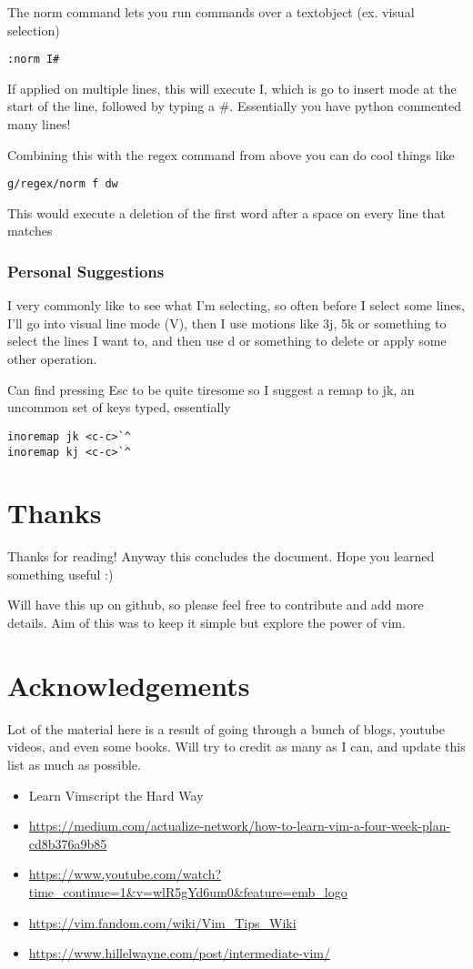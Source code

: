 \documentclass[12pt, letterpaper]{article}
\begin{document}
The norm command lets you run commands over a textobject (ex. visual selection)
\begin{verbatim}
:norm I#
\end{verbatim}
If applied on multiple lines, this will execute I, which is go to insert mode
at the start of the line, followed by typing a \#. Essentially you have python
commented many lines!


Combining this with the regex command from above you can do cool things like
\begin{verbatim}
g/regex/norm f dw 
\end{verbatim}
This would execute a deletion of the first word after a space on every line that matches


\subsubsection{Personal Suggestions}
I very commonly like to see what I'm selecting, so often before I select some
lines, I'll go into visual line mode (V), then I use motions like 3j, 5k or
something to select the lines I want to, and then use d or something to delete
or apply some other operation.


Can find pressing Esc to be quite tiresome so I suggest a remap to jk, an
uncommon set of keys typed, essentially 

\begin{verbatim}
inoremap jk <c-c>`^
inoremap kj <c-c>`^
\end{verbatim}

\section{Thanks}
Thanks for reading! Anyway this concludes the document. Hope you learned
something useful :)

Will have this up on github, so please feel free to contribute and add more
details. Aim of this was to keep it simple but explore the power of vim.

\section{Acknowledgements}
Lot of the material here is a result of going through a bunch of blogs, youtube
videos, and even some books. Will try to credit as many as I can, and update
this list as much as possible.

\begin{itemize}
    \item Learn Vimscript the Hard Way
    \item
        \url{https://medium.com/actualize-network/how-to-learn-vim-a-four-week-plan-cd8b376a9b85}
    \item
        \url{https://www.youtube.com/watch?time_continue=1&v=wlR5gYd6um0&feature=emb_logo}
    \item \url{https://vim.fandom.com/wiki/Vim_Tips_Wiki}
    \item \url{https://www.hillelwayne.com/post/intermediate-vim/}
\end{itemize}
\end{document}
